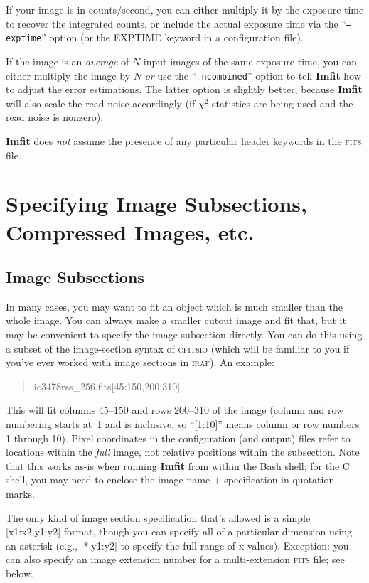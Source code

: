 \documentclass[10pt,a4paper,article]{memoir}
\newcommand{\imfit}{\textbf{Imfit}}
\newcommand{\Imfit}{\textbf{Imfit}}
\newcommand{\chisquare}{\ensuremath{\chi^{2}}}
\begin{document}
If your image is in counts/second, you can either multiply it by the
exposure time to recover the integrated counts, or include the actual
exposure time via the ``\texttt{--exptime}'' option (or the EXPTIME keyword
in a configuration file).

If the image is an \textit{average} of $N$ input images of the same exposure time, you
can either multiply the image by $N$ \textit{or} use the ``\texttt{--ncombined}'' option
to tell \imfit{} how to adjust the error estimations.  The latter option is slightly
better, because \imfit{} will also scale the read noise accordingly (if \chisquare{}
statistics are being used and the read noise is nonzero).

\Imfit{} does \textit{not} assume the presence of any particular header
keywords in the \textsc{fits} file.




\section{Specifying Image Subsections, Compressed Images, etc.}

\subsection{Image Subsections}

In many cases, you may want to fit an object which is much smaller than the whole
image. You can always make a smaller cutout image and fit that, but it may be convenient to
specify the image subsection directly. You can do this using a subset of the image-section
syntax of \textsc{cfitsio} (which will be familiar to you if you've ever worked with
image sections in \textsc{iraf}). An example:
\begin{quote}
ic3478rss\_256.fits[45:150,200:310]
\end{quote}
This will fit columns 45--150 and rows 200--310 of the image (column and
row numbering starts at~1 and is inclusive, so ``[1:10]'' means column or
row numbers 1 through 10). Pixel coordinates in the configuration (and
output) files refer to locations within the \textit{full} image, not
relative positions within the subsection. Note that this works as-is
when running \Imfit{} from within the Bash shell; for the C shell, you
may need to enclose the image name + specification in quotation marks.

The only kind of image section specification that's allowed is a simple
[x1:x2,y1:y2] format, though you can specify all of a particular dimension using
an asterisk (e.g., [*,y1:y2] to specify the full range of x values). Exception:
you can also specify an image extension number for a multi-extension \textsc{fits} file;
see below.
\end{document}
